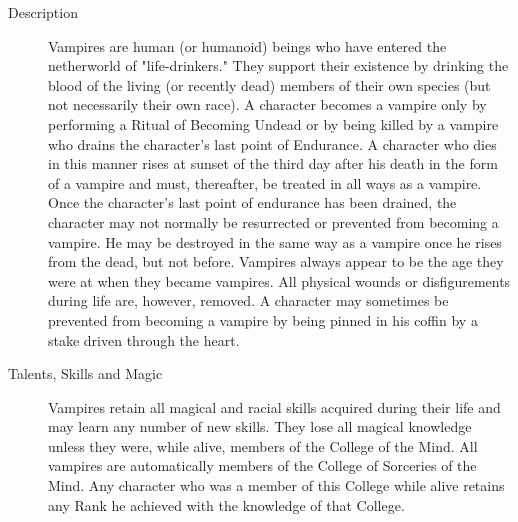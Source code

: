 \begin{multicols*}{2}
\begin{description}
\item[Description]  Vampires are human (or humanoid) beings who
have entered the netherworld of "life-drinkers." They support
their existence by drinking the blood of the living (or recently
dead) members of their own species (but not necessarily their
own race). A character becomes a vampire only by performing a
Ritual of Becoming Undead or by being killed by a vampire who
drains the character's last point of Endurance. A character who
dies in this manner rises at sunset of the third day after his
death in the form of a vampire and must, thereafter, be treated
in all ways as a vampire. Once the character's last point of
endurance has been drained, the character may not normally be
resurrected or prevented from becoming a vampire. He may be
destroyed in the same way as a vampire once he rises from the
dead, but not before. Vampires always appear to be the age they
were at when they became vampires. All physical wounds or
disfigurements during life are, however, removed. A character
may sometimes be prevented from becoming a vampire by being
pinned in his coffin by a stake driven through the heart.


\item[Talents, Skills and Magic] Vampires retain all magical and racial skills acquired
during their life and may learn any number of new skills. They lose
all magical knowledge unless they were, while alive, members of the
College of the Mind. All vampires are automatically members of the
College of Sorceries of the Mind. Any character who was a member of
this College while alive retains any Rank he achieved with the
knowledge of that College.


\end{description}
\end{multicols*}
